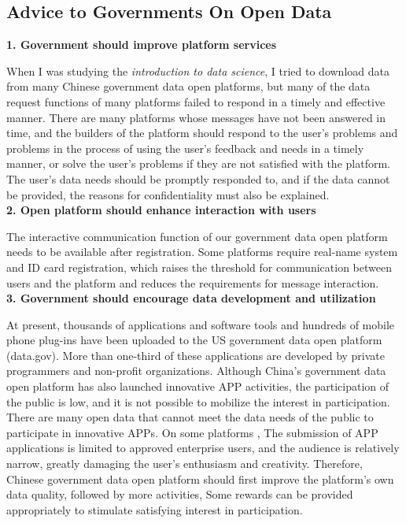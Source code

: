 \documentclass[a4paper, 11pt,twoside=true]{scrartcl}
\begin{document}
\subsection{Advice to Governments On Open Data}
\textbf{1. Government should improve platform services}

\quad When I was studying the \textit{introduction to data science}, I tried to download data from many Chinese government data open platforms, but many of the data request functions of many platforms failed to respond in a timely and effective manner. There are many platforms whose messages have not been answered in time, and the builders of the platform should respond to the user's problems and problems in the process of using the user's feedback and needs in a timely manner, or solve the user's problems if they are not satisfied with the platform. The user's data needs should be promptly responded to, and if the data cannot be provided, the reasons for confidentiality must also be explained.\\
\textbf{2. Open platform should enhance interaction with users}

\quad The interactive communication function of our government data open platform needs to be available after registration. Some platforms require real-name system and ID card registration, which raises the threshold for communication between users and the platform and reduces the requirements for message interaction.\\
\textbf{3. Government should encourage data development and utilization}

\quad At present, thousands of applications and software tools and hundreds of mobile phone plug-ins have been uploaded to the US government data open platform (data.gov). More than one-third of these applications are developed by private programmers and non-profit organizations. Although China's government data open platform has also launched innovative APP activities, the participation of the public is low, and it is not possible to mobilize the interest in participation. There are many open data that cannot meet the data needs of the public to participate in innovative APPs. On some platforms , The submission of APP applications is limited to approved enterprise users, and the audience is relatively narrow, greatly damaging the user's enthusiasm and creativity. Therefore, Chinese government data open platform should first improve the platform's own data quality, followed by more activities, Some rewards can be provided appropriately to stimulate satisfying interest in participation.
\end{document}

